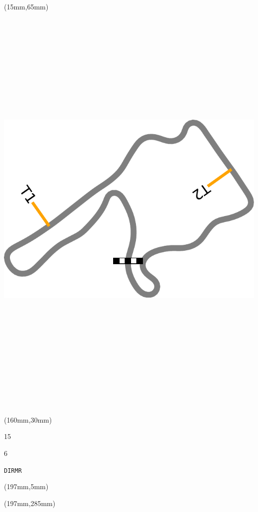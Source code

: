 \begin{textblock*}{185mm}(15mm,65mm)%
\centering
\mbox{\includegraphics[width=185mm,height=210mm,keepaspectratio]{PT/DIRMR.pdf}}
\end{textblock*}
\begin{textblock*}{40mm}(160mm,30mm)%
\Large
\par{} 
\par15 
\par6 
\par\hfill\tiny\tt DIRMR\\
\end{textblock*}
\begin{textblock*}{20mm}(197mm,5mm)%
\fbox{\thepage}
\label{DIRMR}
\end{textblock*}
\begin{textblock*}{20mm}(197mm,285mm)%
\fbox{\thepage}
\end{textblock*}

